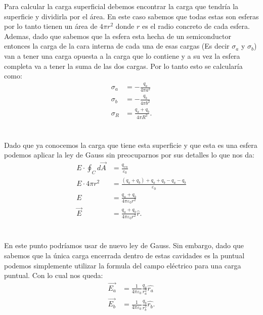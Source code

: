 \documentclass{report}
\begin{document}
Para calcular la carga superficial debemos encontrar la carga que tendría la superficie y dividirla por el área. En este caso sabemos que todas estas son esferas por lo tanto tienen un área de $4\pi r^2$ donde $r$ es el radio concreto de cada esfera. Ademas, dado que sabemos que la esfera esta hecha de un semiconductor entonces la carga de la cara interna de cada una de esas cargas (Es decir $\sigma_a$ y $\sigma_b$) van a tener una carga opuesta a la carga que lo contiene y a su vez la esfera completa va a tener la suma de las dos cargas. Por lo tanto esto se calcularía como:
\begin{align*}
  \sigma_a &= - \frac{q_a}{4\pi a^2} \\
  \sigma_b &= - \frac{q_b}{4\pi b^2} \\
  \sigma_R &= \frac{q_a + q_b}{4\pi R^2}
.\end{align*}

\section{}

Dado que ya conocemos la carga que tiene esta superficie y que esta es una esfera podemos aplicar la ley de Gauss sin preocuparnos por sus detalles lo que nos da:
\begin{align*}
  E \cdot \oint_{C} d\vec{A} &= \frac{q_{en}}{\varepsilon_0} \\ 
  E \cdot 4 \pi r^2 &= \frac{\left( q_a + q_b \right) + q_a + q_b - q_a - q_b}{\varepsilon_0} \\
  E &= \frac{q_a + q_b}{4\pi \varepsilon_0 r^2} \\
  \vec{E} &= \frac{q_a + q_b}{4\pi \varepsilon_0 r^2} \hat{r}
.\end{align*}

\section{}

En este punto podríamos usar de nuevo ley de Gauss. Sin embargo, dado que sabemos que la única carga encerrada dentro de estas cavidades es la puntual podemos simplemente utilizar la formula del campo eléctrico para una carga puntual. Con lo cual nos queda:
\begin{align*}
  \vec{E_a} &= \frac{1}{4\pi\varepsilon_0}\frac{q_a}{r_a^2}\hat{r_a} \\
  \vec{E_b} &= \frac{1}{4\pi\varepsilon_0}\frac{q_b}{r_b^2}\hat{r_b}
.\end{align*}
\end{document}
